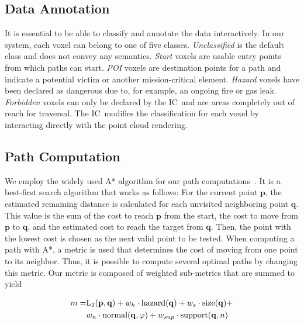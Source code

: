 \documentclass[conference,10pt,letter]{IEEEtran}
\def\IC{IC}
\begin{document}
\subsection{Data Annotation} \label{sec:overview:annotation}
It is essential to be able to classify and annotate the data interactively. In our system, each voxel can belong to one of five classes. \emph{Unclassified} is the default class and does not convey any semantics. \emph{Start} voxels are usable entry points from which paths can start. \emph{POI} voxels are destination points for a path and indicate a potential victim or another mission-critical element. \emph{Hazard} voxels have been declared as dangerous due to, for example, an ongoing fire or gas leak. \emph{Forbidden} voxels can only be declared by the \IC\ and are areas completely out of reach for traversal. The \IC\ modifies the classification for each voxel by interacting directly with the point cloud rendering.

\subsection{Path Computation} \label{sec:overview:pathcomputation}
We employ the widely used A* algorithm for our path computations~\cite{4082128}. It is a best-first search algorithm that works as follows: For the current point $\mathbf{p}$, the estimated remaining distance is calculated for each unvisited neighboring point $\mathbf{q}$. This value is the sum of the cost to reach $\mathbf{p}$ from the start, the cost to move from $\mathbf{p}$ to $\mathbf{q}$, and the estimated cost to reach the target from $\mathbf{q}$. Then, the point with the lowest cost is chosen as the next valid point to be tested. When computing a path with A*, a metric is used that determines the cost of moving from one point to its neighbor. Thus, it is possible to compute several optimal paths by changing this metric. Our metric is composed of weighted sub-metrics that are summed to yield

\begin{equation}
\begin{array}{r@{}l}
m = & \textrm{L}_2(\mathbf{p},\mathbf{q}) + w_h \cdot \textrm{hazard}(\mathbf{q}) + w_s \cdot \textrm{size}(\mathbf{q}) + \vspace*{0.1cm} \\
  & w_n \cdot \textrm{normal}(\mathbf{q},\varphi) + w_{sup} \cdot \textrm{support}(\mathbf{q},n)
\end{array}
\end{equation}
\end{document}
